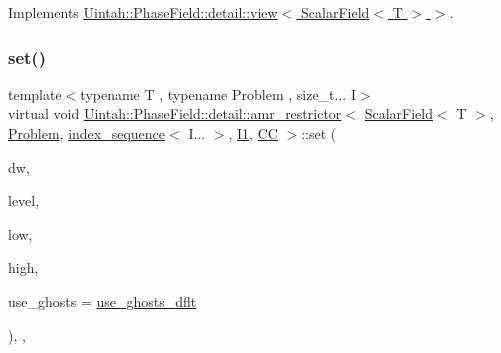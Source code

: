 Implements \hyperlink{classUintah_1_1PhaseField_1_1detail_1_1view_3_01ScalarField_3_01T_01_4_01_4_ae90ea8b33fde8515a1f2e8f5c03c0166}{Uintah\+::\+Phase\+Field\+::detail\+::view$<$ Scalar\+Field$<$ T $>$ $>$}.

\mbox{\label{classUintah_1_1PhaseField_1_1detail_1_1amr__restrictor_3_01ScalarField_3_01T_01_4_00_01Problem_0778720acc9a55f696b8537356a4dbcae_ace64828bcebd35f8bbb6bfc203a08c86}} 
\subsubsection{\texorpdfstring{set()}{set()}\hspace{0.1cm}{\footnotesize\ttfamily [2/2]}}
{\footnotesize\ttfamily template$<$typename T , typename Problem , size\+\_\+t... I$>$ \\
virtual void \hyperlink{classUintah_1_1PhaseField_1_1detail_1_1amr__restrictor}{Uintah\+::\+Phase\+Field\+::detail\+::amr\+\_\+restrictor}$<$ \hyperlink{structUintah_1_1PhaseField_1_1ScalarField}{Scalar\+Field}$<$ T $>$, \hyperlink{classUintah_1_1PhaseField_1_1Problem}{Problem}, \hyperlink{namespaceUintah_1_1PhaseField_a237de804d99512e50613aff7c94a9461}{index\+\_\+sequence}$<$ I... $>$, \hyperlink{namespaceUintah_1_1PhaseField_a547ce3002aa97fbd3ef3192a6eec8406a66f19efe774b0d2b6e5844eb2d83d305}{I1}, \hyperlink{namespaceUintah_1_1PhaseField_a33d355affda78a83f45755ba8388cedda22303704507d024d1d6508ed9859a85a}{CC} $>$\+::set (\begin{DoxyParamCaption}\item[{Data\+Warehouse $\ast$}]{dw,  }\item[{const Level $\ast$}]{level,  }\item[{const Int\+Vector \&}]{low,  }\item[{const Int\+Vector \&}]{high,  }\item[{bool}]{use\+\_\+ghosts = {\ttfamily \hyperlink{classUintah_1_1PhaseField_1_1detail_1_1amr__restrictor_3_01ScalarField_3_01T_01_4_00_01Problem_0778720acc9a55f696b8537356a4dbcae_a4cae73002d40229c69caae07718b94d4}{use\+\_\+ghosts\+\_\+dflt}} }\end{DoxyParamCaption})\hspace{0.3cm}{\ttfamily [inline]}, {\ttfamily [override]}, {\ttfamily [virtual]}}



